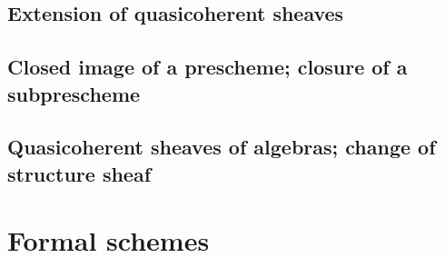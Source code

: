         \subsection{Extension of quasicoherent sheaves}
        
        
        \subsection{Closed image of a prescheme; closure of a subprescheme}
        
        
        \subsection{Quasicoherent sheaves of algebras; change of structure sheaf}
        
        
    \section{Formal schemes}

